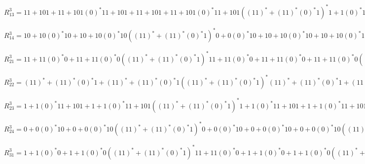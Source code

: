 \documentclass[11pt,a4paper]{report}
\begin{document}
$R_{13}^{3} = 11+101+11+101(0)^{*}11+101+11+101+11+101(0)^{*}11+101((11)^{*}+(11)^{*}(0)^{*}1)^{*}1+1(0)^{*}11+101+11+101+11+101(0)^{*}11+101+11+101+11+101(0)^{*}11+101((11)^{*}+(11)^{*}(0)^{*}1)^{*}1+1(0)^{*}11+101((11)^{*}+(11)^{*}(0)^{*}11+101+(11)^{*}+(11)^{*}(0)^{*}11+101((11)^{*}+(11)^{*}(0)^{*}1)^{*}1+1(0)^{*}11+101)^{*}(11)^{*}+(11)^{*}(0)^{*}11+101+(11)^{*}+(11)^{*}(0)^{*}11+101((11)^{*}+(11)^{*}(0)^{*}1)^{*}1+1(0)^{*}11+101$\\
$R_{14}^{3} = 10+10(0)^{*}10+10+10(0)^{*}10((11)^{*}+(11)^{*}(0)^{*}1)^{*}0+0(0)^{*}10+10+10(0)^{*}10+10+10(0)^{*}10((11)^{*}+(11)^{*}(0)^{*}1)^{*}0+0(0)^{*}10((11)^{*}+(11)^{*}(0)^{*}11+101+(11)^{*}+(11)^{*}(0)^{*}11+101((11)^{*}+(11)^{*}(0)^{*}1)^{*}1+1(0)^{*}11+101)^{*}110+110(0)^{*}10+110+110(0)^{*}10((11)^{*}+(11)^{*}(0)^{*}1)^{*}0+0(0)^{*}10$\\
$R_{21}^{3} = 11+11(0)^{*}0+11+11(0)^{*}0((11)^{*}+(11)^{*}(0)^{*}1)^{*}11+11(0)^{*}0+11+11(0)^{*}0+11+11(0)^{*}0((11)^{*}+(11)^{*}(0)^{*}1)^{*}11+11(0)^{*}0((11)^{*}+(11)^{*}(0)^{*}11+101+(11)^{*}+(11)^{*}(0)^{*}11+101((11)^{*}+(11)^{*}(0)^{*}1)^{*}1+1(0)^{*}11+101)^{*}1+1(0)^{*}0+1+1(0)^{*}0((11)^{*}+(11)^{*}(0)^{*}1)^{*}11+11(0)^{*}0$\\
$R_{22}^{3} = (11)^{*}+(11)^{*}(0)^{*}1+(11)^{*}+(11)^{*}(0)^{*}1((11)^{*}+(11)^{*}(0)^{*}1)^{*}(11)^{*}+(11)^{*}(0)^{*}1+(11)^{*}+(11)^{*}(0)^{*}1+(11)^{*}+(11)^{*}(0)^{*}1((11)^{*}+(11)^{*}(0)^{*}1)^{*}(11)^{*}+(11)^{*}(0)^{*}1((11)^{*}+(11)^{*}(0)^{*}11+101+(11)^{*}+(11)^{*}(0)^{*}11+101((11)^{*}+(11)^{*}(0)^{*}1)^{*}1+1(0)^{*}11+101)^{*}1+1(0)^{*}1+1+1(0)^{*}1((11)^{*}+(11)^{*}(0)^{*}1)^{*}(11)^{*}+(11)^{*}(0)^{*}1$\\
$R_{23}^{3} = 1+1(0)^{*}11+101+1+1(0)^{*}11+101((11)^{*}+(11)^{*}(0)^{*}1)^{*}1+1(0)^{*}11+101+1+1(0)^{*}11+101+1+1(0)^{*}11+101((11)^{*}+(11)^{*}(0)^{*}1)^{*}1+1(0)^{*}11+101((11)^{*}+(11)^{*}(0)^{*}11+101+(11)^{*}+(11)^{*}(0)^{*}11+101((11)^{*}+(11)^{*}(0)^{*}1)^{*}1+1(0)^{*}11+101)^{*}(11)^{*}+(11)^{*}(0)^{*}11+101+(11)^{*}+(11)^{*}(0)^{*}11+101((11)^{*}+(11)^{*}(0)^{*}1)^{*}1+1(0)^{*}11+101$\\
$R_{24}^{3} = 0+0(0)^{*}10+0+0(0)^{*}10((11)^{*}+(11)^{*}(0)^{*}1)^{*}0+0(0)^{*}10+0+0(0)^{*}10+0+0(0)^{*}10((11)^{*}+(11)^{*}(0)^{*}1)^{*}0+0(0)^{*}10((11)^{*}+(11)^{*}(0)^{*}11+101+(11)^{*}+(11)^{*}(0)^{*}11+101((11)^{*}+(11)^{*}(0)^{*}1)^{*}1+1(0)^{*}11+101)^{*}110+110(0)^{*}10+110+110(0)^{*}10((11)^{*}+(11)^{*}(0)^{*}1)^{*}0+0(0)^{*}10$\\
$R_{31}^{3} = 1+1(0)^{*}0+1+1(0)^{*}0((11)^{*}+(11)^{*}(0)^{*}1)^{*}11+11(0)^{*}0+1+1(0)^{*}0+1+1(0)^{*}0((11)^{*}+(11)^{*}(0)^{*}1)^{*}11+11(0)^{*}0((11)^{*}+(11)^{*}(0)^{*}11+101+(11)^{*}+(11)^{*}(0)^{*}11+101((11)^{*}+(11)^{*}(0)^{*}1)^{*}1+1(0)^{*}11+101)^{*}1+1(0)^{*}0+1+1(0)^{*}0((11)^{*}+(11)^{*}(0)^{*}1)^{*}11+11(0)^{*}0$\\
\end{document}
